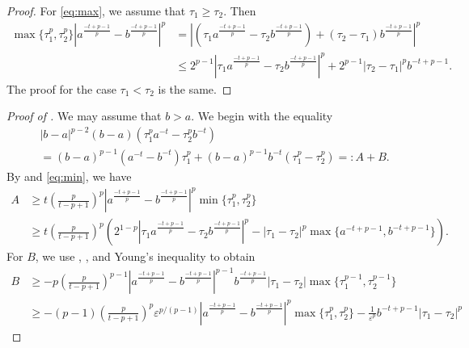 \documentclass[11pt]{amsart}
\theoremstyle{plain}
\theoremstyle{definition}
\numberwithin{equation}{section}
\begin{document}
\begin{appendix}
\begin{proof}
For \eqref{eq:max}, we assume that $\tau_1 \geq \tau_2$. Then
\begin{equation*}
\begin{split}
\max\lbrace \tau_1^p, \tau_2^p \rbrace \left| a^{\frac{-t+p-1}{p}} - b^{\frac{-t+p-1}{p}} \right|^p
&= \left| \left( \tau_1 a^{\frac{-t+p-1}{p}} - \tau_2 b^{\frac{-t+p-1}{p}} \right) + (\tau_2-\tau_1) b^{\frac{-t+p-1}{p}} \right|^p \\
&\leq 2^{p-1} \left| \tau_1 a^{\frac{-t+p-1}{p}} - \tau_2 b^{\frac{-t+p-1}{p}} \right|^p + 2^{p-1} |\tau_2-\tau_1|^p b^{-t+p-1}.
\end{split}
\end{equation*}
The proof for the case $\tau_1 < \tau_2$ is the same.
\end{proof}

\begin{proof} [Proof of ]
We may assume that $b > a$. We begin with the equality
\begin{equation} \label{eq:AB}
\begin{split}
&|b-a|^{p-2}(b-a)(\tau_1^p a^{-t} - \tau_2^p b^{-t}) \\
&= (b-a)^{p-1}(a^{-t} - b^{-t})\tau_1^p + (b-a)^{p-1} b^{-t}(\tau_1^p-\tau_2^p) =: A + B.
\end{split}
\end{equation}
By  and \eqref{eq:min}, we have
\begin{equation} \label{eq:A}
\begin{split}
A
&\geq t\left( \frac{p}{t-p+1} \right)^p \left| a^{\frac{-t+p-1}{p}} - b^{\frac{-t+p-1}{p}} \right|^p \min\lbrace \tau_1^p, \tau_2^p \rbrace \\
&\geq t\left( \frac{p}{t-p+1} \right)^p \left( 2^{1-p} \left| \tau_1 a^{\frac{-t+p-1}{p}} - \tau_2 b^{\frac{-t+p-1}{p}} \right|^p - |\tau_1-\tau_2|^p \max \lbrace a^{-t+p-1}, b^{-t+p-1} \rbrace \right).
\end{split}
\end{equation}
For $B$, we use , , and Young's inequality to obtain
\begin{equation*}
\begin{split}
B
&\geq - p \left( \frac{p}{t-p+1} \right)^{p-1} \left| a^{\frac{-t+p-1}{p}} - b^{\frac{-t+p-1}{p}} \right|^{p-1} b^{\frac{-t+p-1}{p}} |\tau_1-\tau_2| \max\lbrace \tau_1^{p-1}, \tau_2^{p-1} \rbrace \\
&\geq - (p-1) \left( \frac{p}{t-p+1} \right)^p \varepsilon^{p/(p-1)} \left| a^{\frac{-t+p-1}{p}} - b^{\frac{-t+p-1}{p}} \right|^p \max\lbrace \tau_1^p, \tau_2^p \rbrace - \frac{1}{\varepsilon^p} b^{-t+p-1} |\tau_1-\tau_2|^p

\end{split}
\end{equation*}
\end{proof}
\end{appendix}
\end{document}
